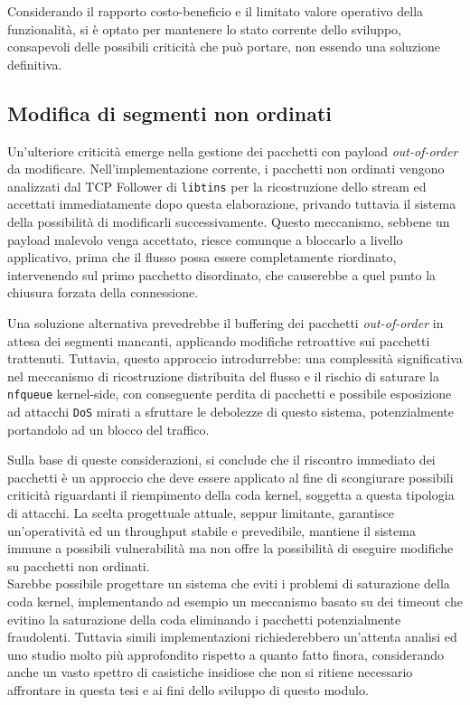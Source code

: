 Considerando il rapporto costo-beneficio e il limitato valore operativo della funzionalità, si è optato per mantenere lo stato corrente dello sviluppo, consapevoli delle possibili criticità che può portare, non essendo una soluzione definitiva.

\subsection{Modifica di segmenti non ordinati}

Un'ulteriore criticità emerge nella gestione dei pacchetti con payload \emph{out-of-order} da modificare. Nell'implementazione corrente, i pacchetti non ordinati vengono analizzati dal TCP Follower di \texttt{libtins} per la ricostruzione dello stream ed accettati immediatamente dopo questa elaborazione, privando tuttavia il sistema della possibilità di modificarli successivamente. Questo meccanismo, sebbene un payload malevolo venga accettato, riesce comunque a bloccarlo a livello applicativo, prima che il flusso possa essere completamente riordinato, intervenendo sul primo pacchetto disordinato, che causerebbe a quel punto la chiusura forzata della connessione.

Una soluzione alternativa prevedrebbe il buffering dei pacchetti \emph{out-of-order} in attesa dei segmenti mancanti, applicando modifiche retroattive sui pacchetti trattenuti. Tuttavia, questo approccio introdurrebbe: una complessità significativa nel meccanismo di ricostruzione distribuita del flusso e il rischio di saturare la \texttt{nfqueue} kernel-side, con conseguente perdita di pacchetti e possibile esposizione ad attacchi \texttt{DoS} mirati a sfruttare le debolezze di questo sistema, potenzialmente portandolo ad un blocco del traffico.

Sulla base di queste considerazioni, si conclude che il riscontro immediato dei pacchetti è un approccio che deve essere applicato al fine di scongiurare possibili criticità riguardanti il riempimento della coda kernel, soggetta a questa tipologia di attacchi. La scelta progettuale attuale, seppur limitante, garantisce un'operatività ed un throughput stabile e prevedibile, mantiene il sistema immune a possibili vulnerabilità ma non offre la possibilità di eseguire modifiche su pacchetti non ordinati.\\

Sarebbe possibile progettare un sistema che eviti i problemi di saturazione della coda kernel, implementando ad esempio un meccanismo basato su dei timeout che evitino la saturazione della coda eliminando i pacchetti potenzialmente fraudolenti. Tuttavia simili implementazioni richiederebbero un'attenta analisi ed uno studio molto più approfondito rispetto a quanto fatto finora, considerando anche un vasto spettro di casistiche insidiose che non si ritiene necessario affrontare in questa tesi e ai fini dello sviluppo di questo modulo.\\

